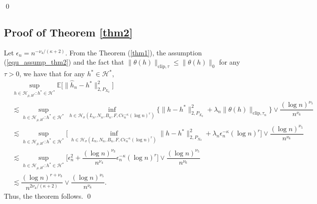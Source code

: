 \documentclass[10pt,twoside]{article}
\numberwithin{equation}{section}
\newcommand{\E}{\ensuremath{\mathbb{E}}}
\begin{document}
\qed  

\medskip


\subsection{Proof of Theorem \ref{thm2}}   
% 
Let $\epsilon_{n}= n^ {-\nu_4 /(\kappa + 2)} $. From the Theorem (\ref{thm1}),  the assumption (\ref{equ_assump_thm2}) and the fact that $\|\theta (h) \|_ {\text{clip}, \tau} \leq \|\theta (h)\|_0$ for any $\tau > 0$, we have that for any $ h^ {*} \in \mathcal{H}^ {*} $, 
%
\begin{align}\label{conver_rate}
\nonumber   & \underset{h \in \mathcal{H}_ {\rho, H^ {*}}: h^ {*} \in \mathcal{H}^ {*}}{\sup} \E \Big[ \| \widehat{h}_n - h^ {*} \|_ {2, P_ {X_0}}^ {2} \Big] 
\\
\nonumber & \lesssim \underset{h \in \mathcal{H}_ {\rho, H^ {*}}: h^ {*} \in \mathcal{H}^ {*}}{\sup} ~ \underset{h \in \mathcal{H}_ {\sigma}(L_n, N_n, B_n,  F, C \epsilon_n^ {-\kappa} (\log n) ^r )}{\inf}  \Big\{ \| h - h^ {*}\|_ {2, P_ {X_0}}^ {2} + \lambda_n \| \theta (h) \|_ { \text{clip}, \tau_n}  \Big\} \lor  \dfrac{(\log n)^ {\nu_5}}{n^ {\nu_6}} 
\\
\nonumber  & \lesssim  \underset{h \in \mathcal{H}_ {\rho, H^ {*}}: h^ {*} \in \mathcal{H}^ {*}}{\sup} \Big[ ~ \underset{h \in \mathcal{H}_ {\sigma} (L_n, N_n, B_n,  F,  C\epsilon_n^ {-\kappa} (\log n) ^r)} {\inf}  \| h - h^ {*} \|_ {2, P_ {X_0}}^ {2}   + \lambda_n \epsilon_n^ {-\kappa} (\log n)^r \Big] \lor  \dfrac{(\log n)^ {\nu_5}}{n^ {\nu_6}}
\\
\nonumber & \lesssim  \underset{h \in \mathcal{H}_{\rho, H^ {*}}: h^ {*} \in \mathcal{H}^ {*}}{\sup} \Big[ \epsilon_n^ {2} +  \dfrac{(\log n)^{\nu_3}}{n^ {\nu_4}}   \epsilon_n^ {-\kappa} (\log n) ^r \Big] \lor  \dfrac{(\log n)^ 
 {\nu_5}}{n^ {\nu_6}} 
\\
 & \lesssim \dfrac{(\log n)^ {r + \nu_3}}{n^{2\nu_4 /(\kappa + 2)}} \lor   \dfrac{(\log n)^ {\nu_5}}{n^ {\nu_6}}.
\end{align}
% 
%
Thus, the theorem follows.
%
\qed 
\end{document}
